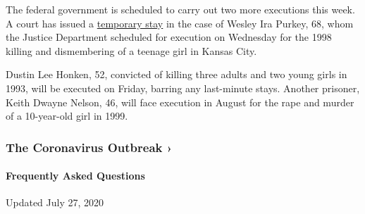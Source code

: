 The federal government is scheduled to carry out two more executions
this week. A court has issued a
\href{http://media.ca7.uscourts.gov/cgi-bin/rssExec.pl?Submit=Display\&Path=Y2020/D07-13/C:19-3318:J:PerCuriam:aut:T:npDp:N:2544729:S:0}{temporary
stay} in the case of Wesley Ira Purkey, 68, whom the Justice Department
scheduled for execution on Wednesday for the 1998 killing and
dismembering of a teenage girl in Kansas City.

Dustin Lee Honken, 52, convicted of killing three adults and two young
girls in 1993, will be executed on Friday, barring any last-minute
stays. Another prisoner, Keith Dwayne Nelson, 46, will face execution in
August for the rape and murder of a 10-year-old girl in 1999.

\href{https://www.nytimes.com/news-event/coronavirus?action=click\&pgtype=Article\&state=default\&region=MAIN_CONTENT_3\&context=storylines_faq}{}

\hypertarget{the-coronavirus-outbreak-}{%
\subsubsection{The Coronavirus Outbreak
›}\label{the-coronavirus-outbreak-}}

\hypertarget{frequently-asked-questions}{%
\paragraph{Frequently Asked
Questions}\label{frequently-asked-questions}}

Updated July 27, 2020

